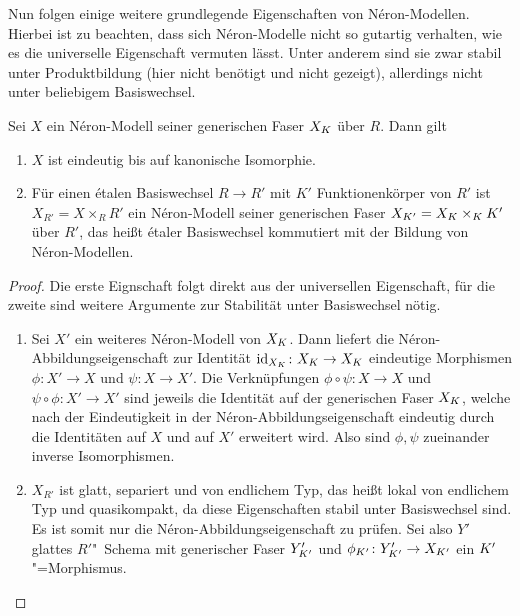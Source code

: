 Nun folgen einige weitere grundlegende Eigenschaften von
Néron-Modellen. Hierbei ist zu beachten, dass sich Néron-Modelle nicht
so gutartig verhalten, wie es die universelle Eigenschaft vermuten lässt.
Unter anderem sind sie zwar stabil unter Produktbildung (hier
nicht benötigt und nicht gezeigt), allerdings nicht unter
beliebigem Basiswechsel.
\begin{Satz}\label{thm:eigneronmodell}
  Sei $X$ ein Néron-Modell seiner generischen Faser $X_{K}$ über
  $R$. Dann gilt
  \begin{enumerate}[label=(\alph*)]
  \item $X$ ist eindeutig bis auf kanonische Isomorphie.
  \item Für einen étalen Basiswechsel $R\to R'$ mit $K'$
    Funktionenkörper von $R'$ ist $X_{R'}=X\times_R R'$ ein Néron-Modell
    seiner generischen Faser $X_{K'}=X_{K}\times_{K}K'$ über $R'$,
    das heißt étaler Basiswechsel kommutiert mit der Bildung von
    Néron-Modellen.
  \end{enumerate}
  \begin{proof}
    Die erste Eignschaft folgt direkt aus der universellen
    Eigenschaft, für die zweite sind weitere Argumente zur Stabilität
    unter Basiswechsel nötig. 
    \begin{enumerate}[resume*,start=1]
    \item Sei $X'$ ein weiteres Néron-Modell von $X_{K}$.
      Dann liefert die Néron-Abbildungseigenschaft zur Identität
      ${\mathrm{id}_{X_{K}}\colon X_{K}\to X_{K}}$ eindeutige Morphismen
      ${\phi\colon X'\to X}$ und ${\psi\colon X\to X'}$.
      Die Verknüpfungen ${\phi\circ\psi\colon X\to X}$ und
      ${\psi\circ\phi\colon X'\to X'}$ sind jeweils die Identität auf
      der generischen Faser $X_{K}$, welche nach der Eindeutigkeit in der
      Néron-Abbildungseigenschaft eindeutig durch die Identitäten auf
      $X$ und auf $X'$ erweitert wird. Also sind $\phi,\psi$
      zueinander inverse Isomorphismen.
    \item
      $X_{R'}$ ist glatt, separiert und von endlichem Typ, das heißt
      lokal von endlichem Typ und quasikompakt, da diese Eigenschaften
      stabil unter Basiswechsel sind. Es ist somit nur die
      Néron-Abbildungseigenschaft zu prüfen.
      Sei also $Y'$ glattes $R'$"~Sche\-ma mit generischer Faser
      $Y_{K'}'$ und ${\phi_{K'}\colon Y_{K'}'\to X_{K'}}$ ein
      $K'$"=Morphismus. 
      \begin{description}

\end{description}
\end{enumerate}
\end{proof}
\end{Satz}
